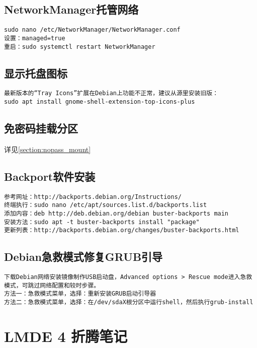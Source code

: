 \documentclass[a4paper,fontset=fandol,zihao=-4,linespread=1.2]{ctexbook}
\begin{document}
\section{NetworkManager托管网络}
\begin{lstlisting}
sudo nano /etc/NetworkManager/NetworkManager.conf
设置：managed=true
重启：sudo systemctl restart NetworkManager
\end{lstlisting}

\section{显示托盘图标}
\begin{lstlisting}
最新版本的“Tray Icons”扩展在Debian上功能不正常，建议从源里安装旧版：
sudo apt install gnome-shell-extension-top-icons-plus
\end{lstlisting}

\section{免密码挂载分区}
详见\ref{section:nopass_mount}

\section{Backport软件安装}
\begin{lstlisting}
参考网址：http://backports.debian.org/Instructions/
终端执行：sudo nano /etc/apt/sources.list.d/backports.list
添加内容：deb http://deb.debian.org/debian buster-backports main
安装方法：sudo apt -t buster-backports install "package"
更新列表：http://backports.debian.org/changes/buster-backports.html
\end{lstlisting}

\section{Debian急救模式修复GRUB引导}
\begin{lstlisting}
下载Debian网络安装镜像制作USB启动盘，Advanced options > Rescue mode进入急救模式，可跳过网络配置和较时步骤。
方法一：急救模式菜单，选择：重新安装GRUB启动引导器
方法二：急救模式菜单，选择：在/dev/sdaX根分区中运行shell，然后执行grub-install
\end{lstlisting}


\chapter{LMDE 4 折腾笔记}
\end{document}
